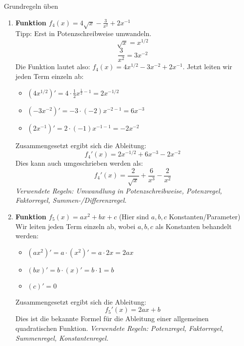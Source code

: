 \begin{loesungsumgebung}{Grundregeln üben}
\begin{enumerate}[label=(\alph*)]
    \item \textbf{Funktion $f_4(x) = 4\sqrt{x} - \frac{3}{x^2} + 2x^{-1}$} \\
    Tipp: Erst in Potenzschreibweise umwandeln.
    $$ \sqrt{x} = x^{1/2} $$
    $$ \frac{3}{x^2} = 3x^{-2} $$
    Die Funktion lautet also: $f_4(x) = 4x^{1/2} - 3x^{-2} + 2x^{-1}$.
    Jetzt leiten wir jeden Term einzeln ab:
    \begin{itemize}
        \item $(4x^{1/2})' = 4 \cdot \frac{1}{2}x^{\frac{1}{2}-1} = 2x^{-1/2}$
        \item $(-3x^{-2})' = -3 \cdot (-2)x^{-2-1} = 6x^{-3}$
        \item $(2x^{-1})' = 2 \cdot (-1)x^{-1-1} = -2x^{-2}$
    \end{itemize}
    Zusammengesetzt ergibt sich die Ableitung:
    $$ f_4'(x) = 2x^{-1/2} + 6x^{-3} - 2x^{-2} $$
    Dies kann auch umgeschrieben werden als:
    $$ f_4'(x) = \frac{2}{\sqrt{x}} + \frac{6}{x^3} - \frac{2}{x^2} $$
    \textit{Verwendete Regeln: Umwandlung in Potenzschreibweise, Potenzregel, Faktorregel, Summen-/Differenzregel.}

    \item \textbf{Funktion $f_5(x) = ax^2 + bx + c$} (Hier sind $a,b,c$ Konstanten/Parameter) \\
    Wir leiten jeden Term einzeln ab, wobei $a, b, c$ als Konstanten behandelt werden:
    \begin{itemize}
        \item $(ax^2)' = a \cdot (x^2)' = a \cdot 2x = 2ax$
        \item $(bx)' = b \cdot (x)' = b \cdot 1 = b$
        \item $(c)' = 0$
    \end{itemize}
    Zusammengesetzt ergibt sich die Ableitung:
    $$ f_5'(x) = 2ax + b $$
    Dies ist die bekannte Formel für die Ableitung einer allgemeinen quadratischen Funktion.
    \textit{Verwendete Regeln: Potenzregel, Faktorregel, Summenregel, Konstantenregel.}
\end{enumerate}

\end{loesungsumgebung}


